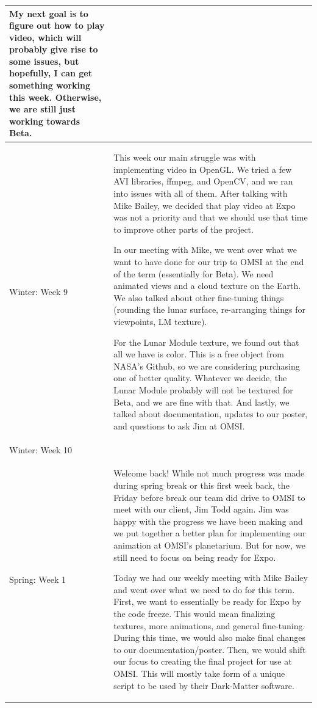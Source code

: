 \documentclass[onecolumn, draftclsnofoot,10pt, compsoc]{IEEEtran}
\begin{document}
\begin{longtable} {|p{1.5cm}|p{13.5cm}|}
 

My next goal is to figure out how to play video, which will probably give rise to some issues, but hopefully, I can get something working this week. Otherwise, we are still just working towards Beta. 
\\ \hline

Winter: Week 9 & 
This week our main struggle was with implementing video in OpenGL. We tried a few AVI libraries, ffmpeg, and OpenCV, and we ran into issues with all of them. After talking with Mike Bailey, we decided that play video at Expo was not a priority and that we should use that time to improve other parts of the project. 

In our meeting with Mike, we went over what we want to have done for our trip to OMSI at the end of the term (essentially for Beta). We need animated views and a cloud texture on the Earth. We also talked about other fine-tuning things (rounding the lunar surface, re-arranging things for viewpoints, LM texture). 

For the Lunar Module texture, we found out that all we have is color. This is a free object from NASA's Github, so we are considering purchasing one of better quality. Whatever we decide, the Lunar Module probably will not be textured for Beta, and we are fine with that. And lastly, we talked about documentation, updates to our poster, and questions to ask Jim at OMSI. 
\\ \hline

Winter: Week 10 & 
\\ \hline

Spring: Week 1 & Welcome back! While not much progress was made during spring break or this first week back, the Friday before break our team did drive to OMSI to meet with our client, Jim Todd again. Jim was happy with the progress we have been making and we put together a better plan for implementing our animation at OMSI's planetarium. But for now, we still need to focus on being ready for Expo.

Today we had our weekly meeting with Mike Bailey and went over what we need to do for this term. First, we want to essentially be ready for Expo by the code freeze. This would mean finalizing textures, more animations, and general fine-tuning. During this time, we would also make final changes to our documentation/poster. Then, we would shift our focus to creating the final project for use at OMSI. This will mostly take form of a unique script to be used by their Dark-Matter software. 
\\ \hline


\end{longtable}
\end{document}
